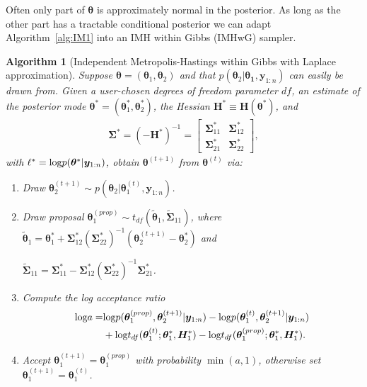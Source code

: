 \documentclass[12pt]{article}
\def\log{\hbox{log}}
\newtheorem{alg}{Algorithm}
\begin{document}
Often only part of $\bm{\theta}$ is approximately normal in the posterior. As long as the other part has a tractable conditional posterior we can adapt Algorithm~\ref{alg:IM1} into an IMH within Gibbs (IMHwG) sampler. 
\begin{alg}[Independent Metropolis-Hastings within Gibbs with Laplace approximation]\label{alg:IM2}
Suppose $\bm{\theta} = (\bm{\theta}_1, \bm{\theta}_2)$ and that $p(\bm{\theta}_2|\bm{\theta_1}, \bm{y}_{1:n})$ can easily be drawn from. Given a user-chosen degrees of freedom parameter $df$, an estimate of the posterior mode $\bm{\theta}^* = (\bm{\theta}_1^*, \bm{\theta}_2^*)$, the Hessian $\bm{H}^* \equiv \bm{H}(\bm{\theta}^*)$, and 
\begin{align*}
\bm{\Sigma}^* = (-\bm{H}^*)^{-1} = \begin{bmatrix} \bm{\Sigma}^*_{11} & \bm{\Sigma}^*_{12} \\ \bm{\Sigma}^*_{21} & \bm{\Sigma}^*_{22} \end{bmatrix},
\end{align*}
with $\ell^* = \log p(\bm{\theta}^*|\bm{y}_{1:n})$, obtain $\bm{\theta}^{(t+1)}$ from $\bm{\theta}^{(t)}$ via:
\begin{enumerate}
\item Draw $\bm{\theta}_2^{(t+1)} \sim p(\bm{\theta}_2|\bm{\theta}_1^{(t)},\bm{y}_{1:n})$.
\item Draw proposal $\bm{\theta}_1^{(prop)} \sim t_{df}(\widetilde{\bm{\theta}}_1, \widetilde{\bm{\Sigma}}_{11})$, where $\widetilde{\bm{\theta}}_1 = \bm{\theta}_1^* + \bm{\Sigma}_{12}^*(\bm{\Sigma}_{22}^*)^{-1}(\bm{\theta}_2^{(t+1)} - \bm{\theta}_2^*)$ and 

$\widetilde{\bm{\Sigma}}_{11} = \bm{\Sigma}_{11}^* - \bm{\Sigma}_{12}^*(\bm{\Sigma}_{22}^*)^{-1}\bm{\Sigma}_{21}^*$.
\item Compute the log acceptance ratio 
\begin{align*}
\log a =& \log p(\bm{\theta}_1^{(prop)}, \bm{\theta}_2^{(t+1)}|\bm{y}_{1:n}) - \log p(\bm{\theta}_1^{(t)}, \bm{\theta}_2^{(t+1)}|\bm{y}_{1:n}) \\
&+ \log t_{df}(\bm{\theta}_1^{(t)}; \bm{\theta}_1^*, \bm{H}_1^*) - \log t_{df}(\bm{\theta}_1^{(prop)}; \bm{\theta}_1^*, \bm{H}_1^*).
\end{align*}
\item Accept $\bm{\theta}_1^{(t+1)} = \bm{\theta}_1^{(prop)}$ with probability $\min(a,1)$, otherwise set $\bm{\theta}_1^{(t+1)} = \bm{\theta}_1^{(t)}$.
\end{enumerate}
\end{alg}
\end{document}
